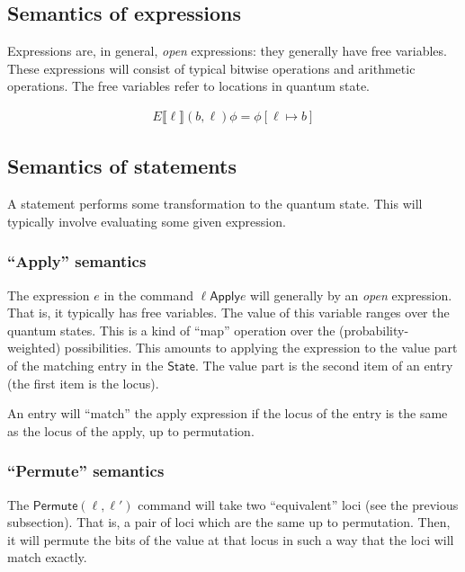 \documentclass[runningheads]{llncs}
\newcommand {\State} {\textsf{State}}
\newcommand {\sem} [1] {\llbracket #1 \rrbracket}
\newcommand {\Esem} [1] {E\sem{#1}}
\newcommand {\Apply} {\textsf{Apply}}
\newcommand {\Permute} {\textsf{Permute}}
\begin{document}
\subsection{Semantics of expressions}

Expressions are, in general, \textit{open} expressions: they generally have free variables. These expressions will consist of typical bitwise operations and arithmetic operations. The free variables refer to locations in quantum state.

\[
  \begin{array}{c}
    \Esem{\ell}(b, \ell)\phi = \phi[\ell \mapsto b]
  \end{array}
\]

\subsection{Semantics of statements}

A statement performs some transformation to the quantum state. This will typically involve evaluating some given expression.

\subsubsection{``Apply'' semantics}

The expression $e$ in the command $\ell \Apply e$ will generally by an \textit{open} expression. That is, it typically has free variables. The value of this variable ranges over the quantum states. This is a kind of ``map'' operation over the (probability-weighted) possibilities. This amounts to applying the expression to the value part of the matching entry in the $\State$. The value part is the second item of an entry (the first item is the locus).

An entry will ``match'' the apply expression if the locus of the entry is the same as the locus of the apply, up to permutation.

\subsubsection{``Permute'' semantics}

The $\Permute(\ell, \ell')$ command will take two ``equivalent'' loci (see the previous subsection). That is, a pair of loci which are the same up to permutation. Then, it will permute the bits of the value at that locus in such a way that the loci will match exactly.
\end{document}
